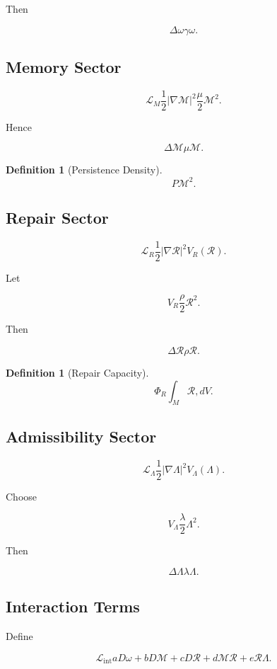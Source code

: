 \documentclass[12pt]{article}
\newtheorem{definition}[theorem]{Definition}
\theoremstyle{remark}
\begin{document}
Then

\[
\Delta\omega
\gamma\omega.
\]

\subsection{Memory Sector}

\[
\mathcal L_M
\frac12
|\nabla\mathcal M|^2

\frac{\mu}{2}\mathcal M^2.
\]

Hence

\[
\Delta\mathcal M
\mu\mathcal M.
\]

\begin{definition}[Persistence Density]
\[
P
\mathcal M^2.
\]
\end{definition}

\subsection{Repair Sector}

\[
\mathcal L_R
\frac12
|\nabla\mathcal R|^2

V_R(\mathcal R).
\]

Let

\[
V_R
\frac{\rho}{2}\mathcal R^2.
\]

Then

\[
\Delta\mathcal R
\rho\mathcal R.
\]

\begin{definition}[Repair Capacity]
\[
\Phi_R
\int_M
\mathcal R
,dV.
\]
\end{definition}

\subsection{Admissibility Sector}

\[
\mathcal L_\Lambda
\frac12
|\nabla\Lambda|^2

V_\Lambda(\Lambda).
\]

Choose

\[
V_\Lambda
\frac{\lambda}{2}\Lambda^2.
\]

Then

\[
\Delta\Lambda
\lambda\Lambda.
\]

\subsection{Interaction Terms}

Define

\[
\mathcal L_{\mathrm{int}}
aD\omega
+
bD\mathcal M
+
cD\mathcal R
+
d\mathcal M\mathcal R
+
e\mathcal R\Lambda.
\]
\end{document}
